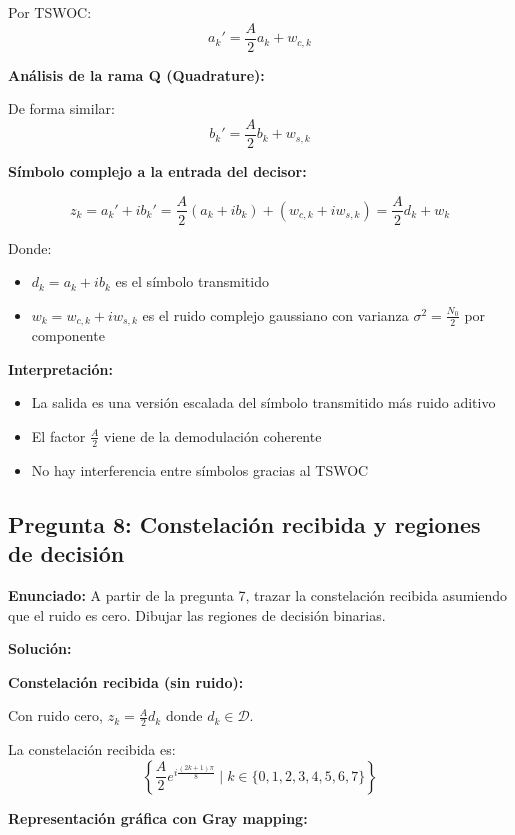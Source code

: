 \documentclass[11pt,a4paper]{article}
\begin{document}
Por TSWOC:
\[
a_k' = \frac{A}{2} a_k + w_{c,k}
\]

\textbf{An\'alisis de la rama Q (Quadrature):}

De forma similar:
\[
b_k' = \frac{A}{2} b_k + w_{s,k}
\]

\textbf{S\'imbolo complejo a la entrada del decisor:}

\[
\boxed{z_k = a_k' + ib_k' = \frac{A}{2}(a_k + ib_k) + (w_{c,k} + iw_{s,k}) = \frac{A}{2}d_k + w_k}
\]

Donde:
\begin{itemize}
    \item $d_k = a_k + ib_k$ es el s\'imbolo transmitido
    \item $w_k = w_{c,k} + iw_{s,k}$ es el ruido complejo gaussiano con varianza $\sigma^2 = \frac{N_0}{2}$ por componente
\end{itemize}

\textbf{Interpretaci\'on:}
\begin{itemize}
    \item La salida es una versi\'on escalada del s\'imbolo transmitido m\'as ruido aditivo
    \item El factor $\frac{A}{2}$ viene de la demodulaci\'on coherente
    \item No hay interferencia entre s\'imbolos gracias al TSWOC
\end{itemize}



\subsection*{Pregunta 8: Constelaci\'on recibida y regiones de decisi\'on}

\textbf{Enunciado:} A partir de la pregunta 7, trazar la constelaci\'on recibida asumiendo que el ruido es cero. Dibujar las regiones de decisi\'on binarias.

\vspace{0.3cm}
\textbf{Soluci\'on:}

\textbf{Constelaci\'on recibida (sin ruido):}

Con ruido cero, $z_k = \frac{A}{2}d_k$ donde $d_k \in \mathcal{D}$.

La constelaci\'on recibida es:
\[
\left\{\frac{A}{2}e^{i\frac{(2k+1)\pi}{8}} \mid k \in \{0,1,2,3,4,5,6,7\}\right\}
\]

\textbf{Representaci\'on gr\'afica con Gray mapping:}
\end{document}
